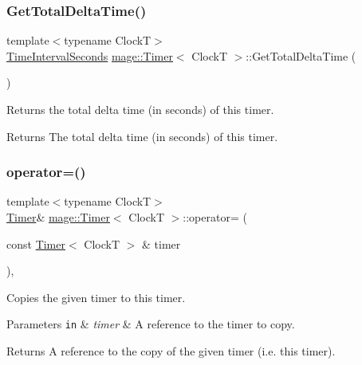 \subsubsection{\texorpdfstring{Get\+Total\+Delta\+Time()}{GetTotalDeltaTime()}}
{\footnotesize\ttfamily template$<$typename ClockT$>$ \\
\mbox{\hyperlink{namespacemage_a21c3d1575018d1e0720948713c76be1f}{Time\+Interval\+Seconds}} \mbox{\hyperlink{classmage_1_1_timer}{mage\+::\+Timer}}$<$ ClockT $>$\+::Get\+Total\+Delta\+Time (\begin{DoxyParamCaption}{ }\end{DoxyParamCaption})\hspace{0.3cm}{\ttfamily [noexcept]}}

Returns the total delta time (in seconds) of this timer.

\begin{DoxyReturn}{Returns}
The total delta time (in seconds) of this timer. 
\end{DoxyReturn}
\mbox{\label{classmage_1_1_timer_a2a8aefb272e02d8ba4a26058df80f119}} 
\subsubsection{\texorpdfstring{operator=()}{operator=()}\hspace{0.1cm}{\footnotesize\ttfamily [1/2]}}
{\footnotesize\ttfamily template$<$typename ClockT$>$ \\
\mbox{\hyperlink{classmage_1_1_timer}{Timer}}\& \mbox{\hyperlink{classmage_1_1_timer}{mage\+::\+Timer}}$<$ ClockT $>$\+::operator= (\begin{DoxyParamCaption}\item[{const \mbox{\hyperlink{classmage_1_1_timer}{Timer}}$<$ ClockT $>$ \&}]{timer }\end{DoxyParamCaption})\hspace{0.3cm}{\ttfamily [default]}, {\ttfamily [noexcept]}}

Copies the given timer to this timer.


\begin{DoxyParams}[1]{Parameters}
\mbox{\tt in}  & {\em timer} & A reference to the timer to copy. \\
\hline
\end{DoxyParams}
\begin{DoxyReturn}{Returns}
A reference to the copy of the given timer (i.\+e. this timer). 
\end{DoxyReturn}
\mbox{\label{classmage_1_1_timer_a39654f81efccc38a4cbe6164659407dd}} 
